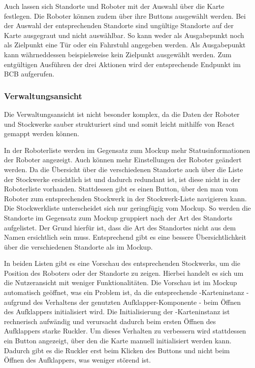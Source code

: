 Auch lassen sich Standorte und Roboter mit der Auswahl über die Karte festlegen. Die Roboter können zudem über ihre Buttons ausgewählt werden. Bei der Auswahl der entsprechenden Standorte sind ungültige Standorte auf der Karte ausgegraut und nicht auswählbar. So kann weder als Ausgabepunkt noch als Zielpunkt eine Tür oder ein Fahrstuhl angegeben werden. Als Ausgabepunkt kann währneddessen beispielsweise kein Zielpunkt ausgewählt werden. Zum entgültigen Ausführen der drei Aktionen wird der entsprechende Endpunkt im \ac{BCB} aufgerufen.

\subsubsection{Verwaltungsansicht}
Die Verwaltungsansicht ist nicht besonder komplex, da die Daten der Roboter und Stockwerke sauber strukturiert sind und somit leicht mithilfe von React gemappt werden können.

In der Roboterliste werden im Gegensatz zum Mockup mehr Statusinformationen der Roboter angezeigt. Auch können mehr Einstellungen der Roboter geändert werden. Da die Übersicht über die verschiedenen Standorte auch über die Liste der Stockwerke ersichtlich ist und dadurch redundant ist, ist diese nicht in der Roboterliste vorhanden. Stattdessen gibt es einen Button, über den man vom Roboter zum entsprechenden Stockwerk in der Stockwerk-Liste navigieren kann. Die Stockwerkliste unterscheidet sich nur geringfügig vom Mockup. So werden die Standorte im Gegensatz zum Mockup gruppiert nach der Art des Standorts aufgelistet. Der Grund hierfür ist, dass die Art des Standortes nicht aus dem Namen ersichtlich sein muss. Entsprechend gibt es eine bessere Übersichtlichkeit über die verschiedenen Standorte als im Mockup.

In beiden Listen gibt es eine Vorschau des entsprechenden Stockwerks, um die Position des Roboters oder der Standorte zu zeigen. Hierbei handelt es sich um die Nutzeransicht mit weniger Funktionalitäten. Die Vorschau ist im Mockup automatisch geöffnet, was ein Problem ist, da die entsprechende \deckgl{}-Karteninstanz - aufgrund des Verhaltens der genutzten Aufklapper-Komponente - beim Öffnen des Aufklappers initialisiert wird. Die Initialisierung der \deckgl{}-Karteninstanz ist rechnerisch aufwändig und verursacht dadurch beim ersten Öffnen des Aufklappers starke Ruckler. Um dieses Verhalten zu verbessern wird stattdessen ein Button angezeigt, über den die Karte manuell initialisiert werden kann. Dadurch gibt es die Ruckler erst beim Klicken des Buttons und nicht beim Öffnen des Aufklappers, was weniger störend ist.

